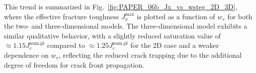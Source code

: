 \documentclass[pdflatex,sn-mathphys-num]{sn-jnl}%
\theoremstyle{thmstyleone}%
\theoremstyle{thmstyletwo}%
\theoremstyle{thmstylethree}%
\begin{document}
This trend is summarized in Fig.~\ref{fig:PAPER_06b_Jx_vs_wsteg_2D_3D}, where the effective fracture toughness $J_x^{\text{max}}$ is plotted as a function of $w_s$ for both the two- and three-dimensional models. The three-dimensional model exhibits a similar qualitative behavior, with a slightly reduced saturation value of $\approx1.15J_c^{\text{num,pl}}$ compared to $\approx1.25J_c^{\text{num,pl}}$ for the 2D case and a weaker dependence on $w_s$, 
reflecting the reduced crack trapping due to the additional degree of freedom for crack front propagation.







\end{document}
